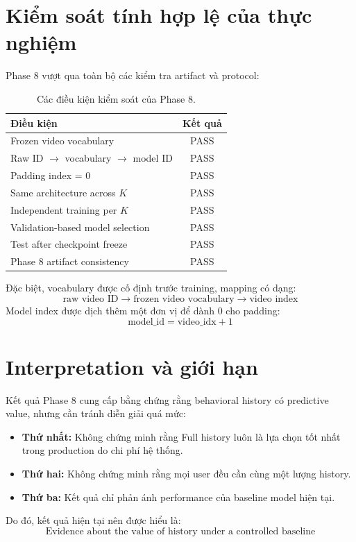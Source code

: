 \documentclass[12pt,a4paper]{article}
\begin{document}
\section{Kiểm soát tính hợp lệ của thực nghiệm}

Phase 8 vượt qua toàn bộ các kiểm tra artifact và protocol:

\begin{table}[H]
\centering
\caption{Các điều kiện kiểm soát của Phase 8.}
\begin{tabular}{lc}
\toprule
\textbf{Điều kiện} & \textbf{Kết quả} \\
\midrule
Frozen video vocabulary & PASS \\
Raw ID $\rightarrow$ vocabulary $\rightarrow$ model ID & PASS \\
Padding index = 0 & PASS \\
Same architecture across $K$ & PASS \\
Independent training per $K$ & PASS \\
Validation-based model selection & PASS \\
Test after checkpoint freeze & PASS \\
Phase 8 artifact consistency & PASS \\
\bottomrule
\end{tabular}
\end{table}

Đặc biệt, vocabulary được cố định trước training, mapping có dạng:
\[
\text{raw video ID} \rightarrow \text{frozen video vocabulary} \rightarrow \text{video index}
\]
Model index được dịch thêm một đơn vị để dành $0$ cho padding:
\[
\text{model\_id} = \text{video\_idx} + 1
\]

\section{Interpretation và giới hạn}

Kết quả Phase 8 cung cấp bằng chứng rằng behavioral history có predictive value, nhưng cần tránh diễn giải quá mức:
\begin{itemize}[noitemsep]
    \item \textbf{Thứ nhất:} Không chứng minh rằng Full history luôn là lựa chọn tốt nhất trong production do chi phí hệ thống.
    \item \textbf{Thứ hai:} Không chứng minh rằng mọi user đều cần cùng một lượng history.
    \item \textbf{Thứ ba:} Kết quả chỉ phản ánh performance của baseline model hiện tại.
\end{itemize}
Do đó, kết quả hiện tại nên được hiểu là:
\[
\boxed{ \text{Evidence about the value of history under a controlled baseline} }
\]
\end{document}
